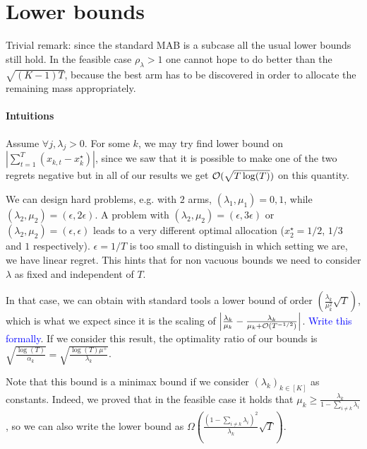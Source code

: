 \section{Lower bounds}

Trivial remark: since the standard MAB is a subcase all the usual lower bounds still hold. In the feasible case $\rho_\lambda>1$ one cannot hope to do better than the $\sqrt{(K-1)T}$, because the best arm has to be discovered in order to allocate the remaining mass appropriately.

\paragraph{Intuitions} Assume $\forall j, \lambda_j >0$. For some $k$, we may try find lower bound on $|\sum_{t=1}^T (x_{k, t}-x_k^\star)|$, since we saw that it is possible to make one of the two regrets negative but in all of our results we get $\mathcal{O}(\sqrt{T\log(T)})$ on this quantity. 

We can design hard problems, e.g. with $2$ arms, $(\lambda_1, \mu_1)=0, 1$, while  $(\lambda_2, \mu_2)=(\epsilon, 2\epsilon)$. A problem with $(\lambda_2, \mu_2)=(\epsilon, 3\epsilon)$ or $(\lambda_2, \mu_2)=(\epsilon, \epsilon)$ leads to a very different optimal allocation ($x_2^\star=1/2$, $1/3$ and $1$ respectively). $\epsilon=1/T$ is too small to distinguish in which setting we are, we have linear regret. This hints that for non vacuous bounds we need to consider $\lambda$ as fixed and independent of $T$.

In that case, we can obtain with standard tools a lower bound of order $\left(\frac{\lambda_k}{\mu_k^2}\sqrt{T} \right)$, which is what we expect since it is the scaling of $\left|\frac{\lambda_k}{\mu_k}-\frac{\lambda_k}{\mu_k+\mathcal{O}(T^{-1/2})}\right|$. \textcolor{blue}{Write this formally}. If we consider this result, the optimality ratio of our bounds is $\sqrt{\frac{\log(T)}{\alpha_k}}=\sqrt{\frac{\log(T)\mu^+}{\lambda_k}}$.

Note that this bound is a minimax bound if we consider $(\lambda_k)_{k \in [K]}$ as constants. Indeed, we proved that in the feasible case it holds that $\mu_k \geq \frac{\lambda_k}{1- \sum_{i\neq k} \lambda_i}$, so we can also write the lower bound as $\Omega\left(\frac{(1- \sum_{i\neq k} \lambda_i)^2}{\lambda_k} \sqrt{T}\right)$.